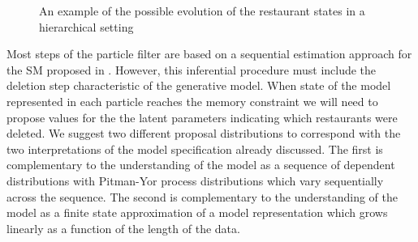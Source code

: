 



\begin{figure}[t] 
	\begin{center}
		\caption{An example of the possible evolution of the restaurant states in a hierarchical setting}
		\label{figResultsCC}
	\end{center} 
\end{figure} 

Most steps of the particle filter are based on a sequential estimation approach for the SM proposed in \cite{Gasthaus2010}.  However, this inferential procedure must include the deletion step characteristic of the generative model.  When state of the model represented in each particle reaches the memory constraint we will need to propose values for the the latent parameters indicating which restaurants were deleted. We suggest two different proposal distributions to correspond with the two interpretations of the model specification already discussed.  The first is complementary to the understanding of the model as a sequence of dependent distributions with Pitman-Yor process distributions which vary sequentially across the sequence.  The second is complementary to the understanding of the model as a finite state approximation of a model representation which grows linearly as a function of the length of the data.

